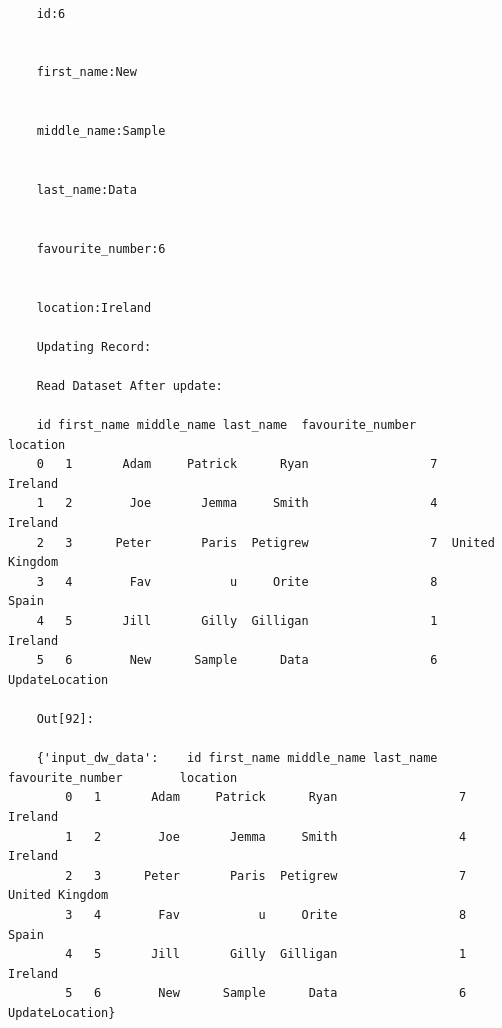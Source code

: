 \documentclass{scrreprt}
\begin{document}
\begin{enumerate}
\begin{itemize}
\begin{lstlisting}
	
	id:6
	
	
	first_name:New
	
	
	middle_name:Sample
	
	
	last_name:Data
	
	
	favourite_number:6
	
	
	location:Ireland
	
	Updating Record:
	
	Read Dataset After update:
	
	id first_name middle_name last_name  favourite_number        location
	0   1       Adam     Patrick      Ryan                 7         Ireland
	1   2        Joe       Jemma     Smith                 4         Ireland
	2   3      Peter       Paris  Petigrew                 7  United Kingdom
	3   4        Fav           u     Orite                 8           Spain
	4   5       Jill       Gilly  Gilligan                 1         Ireland
	5   6        New      Sample      Data                 6  UpdateLocation
	
	Out[92]:
	
	{'input_dw_data':    id first_name middle_name last_name  favourite_number        location
		0   1       Adam     Patrick      Ryan                 7         Ireland
		1   2        Joe       Jemma     Smith                 4         Ireland
		2   3      Peter       Paris  Petigrew                 7  United Kingdom
		3   4        Fav           u     Orite                 8           Spain
		4   5       Jill       Gilly  Gilligan                 1         Ireland
		5   6        New      Sample      Data                 6  UpdateLocation}
\end{lstlisting}
\end{itemize}
%
%
%
%

\end{enumerate}
	
\end{document}
